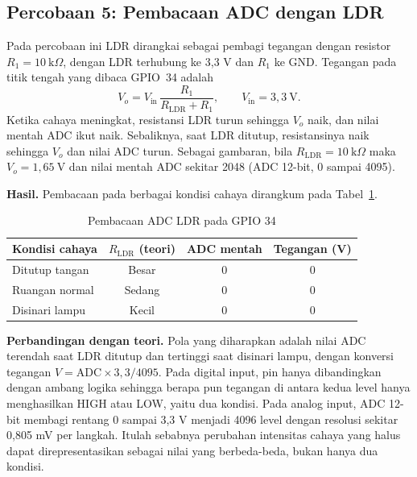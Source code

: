 \subsection{Percobaan 5: Pembacaan ADC dengan LDR}

Pada percobaan ini LDR dirangkai sebagai pembagi tegangan dengan resistor $R_1 = 10\ \mathrm{k}\Omega$, dengan LDR terhubung ke 3{,}3 V dan $R_1$ ke GND. Tegangan pada titik tengah yang dibaca GPIO~34 adalah
\begin{equation}
  V_o = V_{\mathrm{in}} \, \frac{R_1}{R_{\mathrm{LDR}} + R_1}, \qquad V_{\mathrm{in}} = 3{,}3\ \mathrm{V}.
\end{equation}
Ketika cahaya meningkat, resistansi LDR turun sehingga $V_o$ naik, dan nilai mentah ADC ikut naik. Sebaliknya, saat LDR ditutup, resistansinya naik sehingga $V_o$ dan nilai ADC turun. Sebagai gambaran, bila $R_{\mathrm{LDR}} = 10\ \mathrm{k}\Omega$ maka $V_o = 1{,}65\ \mathrm{V}$ dan nilai mentah ADC sekitar 2048 (ADC 12-bit, 0 sampai 4095).

\textbf{Hasil.} Pembacaan pada berbagai kondisi cahaya dirangkum pada Tabel~\ref{tab:p5}.

\begin{table}[H]
  \centering
  \caption{Pembacaan ADC LDR pada GPIO 34}
  \label{tab:p5}
  \begin{tabular}{|l|c|c|c|}
    \hline
    Kondisi cahaya & $R_{\mathrm{LDR}}$ (teori) & ADC mentah & Tegangan (V) \\
    \hline
    Ditutup tangan   & Besar  & 0 & 0 \\
    Ruangan normal   & Sedang & 0 & 0 \\
    Disinari lampu   & Kecil  & 0 & 0 \\
    \hline
  \end{tabular}
\end{table}

\textbf{Perbandingan dengan teori.} Pola yang diharapkan adalah nilai ADC terendah saat LDR ditutup dan tertinggi saat disinari lampu, dengan konversi tegangan $V = \mathrm{ADC} \times 3{,}3/4095$. Pada digital input, pin hanya dibandingkan dengan ambang logika sehingga berapa pun tegangan di antara kedua level hanya menghasilkan HIGH atau LOW, yaitu dua kondisi. Pada analog input, ADC 12-bit membagi rentang 0 sampai 3{,}3 V menjadi 4096 level dengan resolusi sekitar 0{,}805 mV per langkah. Itulah sebabnya perubahan intensitas cahaya yang halus dapat direpresentasikan sebagai nilai yang berbeda-beda, bukan hanya dua kondisi.

